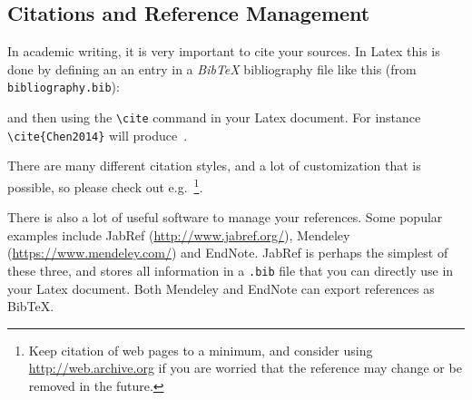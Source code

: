 \subsection{Citations and Reference Management}
In academic writing, it is very important to cite your sources. In Latex this is done by defining an an entry in a \emph{BibTeX} bibliography file like this (from \texttt{bibliography.bib}):

and then using the \texttt{\textbackslash{cite}} command in your Latex document. For instance \texttt{\textbackslash{cite}\{Chen2014\}} will produce~\cite{Chen2014}.

There are many different citation styles, and a lot of customization that is possible, so please check out e.g.~\cite{BiberBibtexEtc,WikibookLatex}\footnote{Keep citation of web pages to a minimum, and consider using \url{http://web.archive.org} if you are worried that the reference may change or be removed in the future.}.

There is also a lot of useful software to manage your references. Some popular examples include JabRef (\url{http://www.jabref.org/}), Mendeley (\url{https://www.mendeley.com/}) and EndNote. JabRef is perhaps the simplest of these three, and stores all information in a \texttt{.bib} file that you can directly use in your Latex document. Both Mendeley and EndNote can export references as BibTeX.
